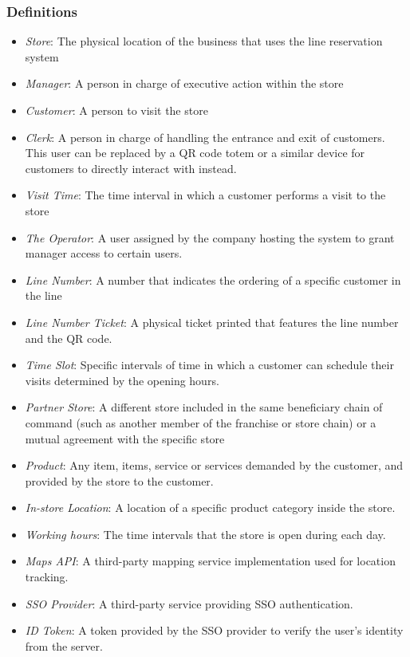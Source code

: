 \subsubsection{Definitions}
\begin{itemize}
    \item \textit{Store}: The physical location of the business that uses the line reservation system
    \item \textit{Manager}: A person in charge of executive action within the store
    \item \textit{Customer}: A person to visit the store
    \item \textit{Clerk}: A person in charge of handling the entrance and exit of customers. This user can be replaced by a QR code totem or a similar device for customers to directly interact with instead.
    \item \textit{Visit Time}: The time interval in which a customer performs a visit to the store
    \item \textit{The Operator}: A user assigned by the company hosting the system to grant manager access to certain users.
    \item \textit{Line Number}: A number that indicates the ordering of a specific customer in the line %
    \item \textit{Line Number Ticket}: A physical ticket printed that features the line number and the QR code.
    \item \textit{Time Slot}: Specific intervals of time in which a customer can schedule their visits determined by the opening hours.
    \item \textit{Partner Store}: A different store included in the same beneficiary chain of command (such as another member of the franchise or store chain) or a mutual agreement with the specific store
    \item \textit{Product}: Any item, items, service or services demanded by the customer, and provided by the store to the customer.
    \item \textit{In-store Location}: A location of a specific product category inside the store.
    \item \textit{Working hours}: The time intervals that the store is open during each day.
    \item \textit{Maps API}: A third-party mapping service implementation used for location tracking.
    \item \textit{SSO Provider}: A third-party service providing SSO authentication.
    \item \textit{ID Token}: A token provided by the SSO provider to verify the user's identity from the server.
\end{itemize}
